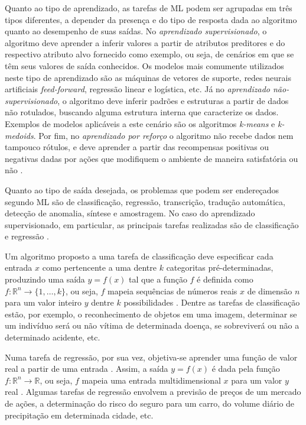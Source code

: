 Quanto ao tipo de aprendizado, as tarefas de ML podem ser agrupadas em três tipos diferentes, a depender da presença e do tipo de resposta dada ao algoritmo quanto ao desempenho de suas saídas. No \emph{aprendizado supervisionado}, o algoritmo deve aprender a inferir valores a partir de atributos preditores e do respectivo atributo alvo fornecido como exemplo, ou seja, de cenários em que se têm seus valores de saída conhecidos. Os modelos mais comumente utilizados neste tipo de aprendizado são as máquinas de vetores de suporte, redes neurais artificiais \emph{feed-forward}, regressão linear e logística, etc. Já no \emph{aprendizado não-supervisionado}, o algoritmo deve inferir padrões e estruturas a partir de dados não rotulados, buscando alguma estrutura interna que caracterize os dados. Exemplos de modelos aplicáveis a este cenário são os algoritmos \emph{k-means} e \emph{k-medoids}.  Por fim, no \emph{aprendizado por reforço} o algoritmo não recebe dados nem tampouco rótulos, e deve aprender a partir das recompensas positivas ou negativas dadas por ações que modifiquem o ambiente de maneira satisfatória ou não \cite{flach2012machine}.

Quanto ao tipo de saída desejada, os problemas que podem ser endereçados segundo ML são de classificação, regressão, transcrição, tradução automática, detecção de anomalia, síntese e amostragem. No caso do aprendizado supervisionado, em particular, as principais tarefas realizadas são de classificação e regressão \cite{flach2012machine}.

Um algoritmo proposto a uma tarefa de classificação deve especificar cada entrada $x$ como pertencente a uma dentre $k$ categoritas pré-determinadas, produzindo uma saída $y=f(x)$ tal que a função $f$ é definida como $f: \mathds{R}^n \rightarrow \{1, \ldots, k\}$, ou seja, $f$ mapeia sequências de números reais  $x$ de dimensão $n$ para um valor inteiro $y$ dentre $k$ possibilidades \cite{goodfellow2016deep}. Dentre as tarefas de classificação estão, por exemplo, o reconhecimento de objetos em uma imagem, determinar se um indivíduo será ou não vítima de determinada doença, se sobreviverá ou não a determinado acidente, etc.

Numa tarefa de regressão, por sua vez, objetiva-se aprender uma função de valor real a partir de uma entrada \cite{flach2012machine}. Assim, a saída $y=f(x)$ é dada pela função $f: \mathds{R}^n \rightarrow \mathds{R}$, ou seja, $f$ mapeia uma entrada multidimensional $x$ para um valor $y$ real \cite{goodfellow2016deep}. Algumas tarefas de regressão envolvem a previsão de preços de um mercado de ações, a determinação do risco do seguro para um carro, do volume diário de precipitação em determinada cidade, etc.

